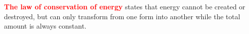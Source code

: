 \documentclass[a4paper,12pt]{book}
\newcounter{example}[chapter]
\newcommand{\piste}{{\fontencoding{U}\fontfamily{futs}\selectfont\char 49\relax}}
\newenvironment{ilight}
  {\centering
  	\vspace*{6pt}
  	\begin{tcolorbox}[colframe=Gray,colback=LightGrey!15]
  \setlength{\baselineskip}{\baselineskip}%
  }
  {\end{tcolorbox}\vspace*{-4pt}}
\newcommand{\keypoint}[1]{\textbf{\textcolor{red}{#1}}}
\renewenvironment{marginfigure}[1][]{\begin{figure}[htbp]\centering}{\end{figure}}
\newcommand{\piste}{\textsuperscript{$\star$}}
\newcommand{\keypoint}[1]{\textbf{\textcolor{red}{#1}}}
\begin{document}








\begin{ilight}
	\keypoint{The law of conservation of energy} states that energy cannot be created or destroyed, but can only transform from one form into another while the total amount is always constant.  
\end{ilight}
\end{document}
